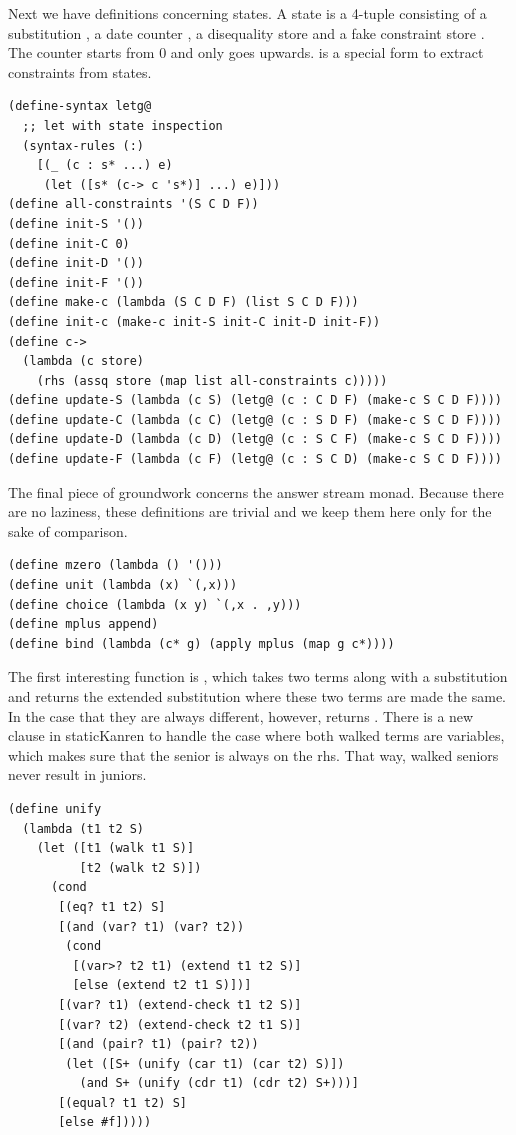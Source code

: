 Next we have definitions concerning states. A state is a 4-tuple consisting of a substitution , a date counter , a disequality store  and a fake constraint store . The counter starts from 0 and only goes upwards.  is a special form to extract constraints from states.
\begin{lstlisting}
(define-syntax letg@
  ;; let with state inspection
  (syntax-rules (:)
    [(_ (c : s* ...) e)
     (let ([s* (c-> c 's*)] ...) e)]))
(define all-constraints '(S C D F))
(define init-S '())
(define init-C 0)
(define init-D '())
(define init-F '())
(define make-c (lambda (S C D F) (list S C D F)))
(define init-c (make-c init-S init-C init-D init-F))
(define c->
  (lambda (c store)
    (rhs (assq store (map list all-constraints c)))))
(define update-S (lambda (c S) (letg@ (c : C D F) (make-c S C D F))))
(define update-C (lambda (c C) (letg@ (c : S D F) (make-c S C D F))))
(define update-D (lambda (c D) (letg@ (c : S C F) (make-c S C D F))))
(define update-F (lambda (c F) (letg@ (c : S C D) (make-c S C D F))))
\end{lstlisting}

The final piece of groundwork concerns the answer stream monad. Because there are no laziness, these definitions are trivial and we keep them here only for the sake of comparison.
\begin{lstlisting}
(define mzero (lambda () '()))
(define unit (lambda (x) `(,x)))
(define choice (lambda (x y) `(,x . ,y)))
(define mplus append)
(define bind (lambda (c* g) (apply mplus (map g c*))))
\end{lstlisting}

The first interesting function is , which takes two terms along with a substitution and returns the extended substitution where these two terms are made the same. In the case that they are always different, however,  returns . There is a new clause in staticKanren to handle the case where both walked terms are variables, which makes sure that the senior is always on the rhs. That way, walked seniors never result in juniors.
\begin{lstlisting}
(define unify
  (lambda (t1 t2 S)
    (let ([t1 (walk t1 S)]
          [t2 (walk t2 S)])
      (cond
       [(eq? t1 t2) S]
       [(and (var? t1) (var? t2))
        (cond
         [(var>? t2 t1) (extend t1 t2 S)]
         [else (extend t2 t1 S)])]
       [(var? t1) (extend-check t1 t2 S)]
       [(var? t2) (extend-check t2 t1 S)]
       [(and (pair? t1) (pair? t2))
        (let ([S+ (unify (car t1) (car t2) S)])
          (and S+ (unify (cdr t1) (cdr t2) S+)))]
       [(equal? t1 t2) S]
       [else #f]))))
\end{lstlisting}

